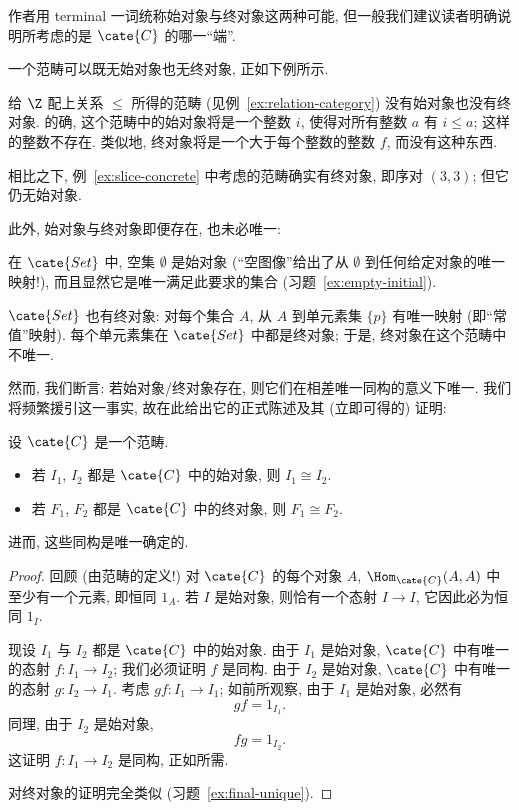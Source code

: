 作者用 terminal 一词统称始对象与终对象这两种可能, 但一般我们建议读者明确说明所考虑的是 $\cate{C}$ 的哪一``端''.

一个范畴可以既无始对象也无终对象, 正如下例所示.

\begin{example}
\label{ex:no-initial-final}
给 $\Z$ 配上关系 $\leq$ 所得的范畴 (见例~\ref{ex:relation-category}) 没有始对象也没有终对象. 的确, 这个范畴中的始对象将是一个整数 $i$, 使得对所有整数 $a$ 有 $i \leq a$; 这样的整数不存在. 类似地, 终对象将是一个大于每个整数的整数 $f$, 而没有这种东西.

相比之下, 例~\ref{ex:slice-concrete} 中考虑的范畴确实有终对象, 即序对 $(3,3)$; 但它仍无始对象.
\end{example}

此外, 始对象与终对象即便存在, 也未必唯一:

\begin{example}
\label{ex:final-singletons}
在 $\cate{Set}$ 中, 空集 $\emptyset$ 是始对象 (``空图像''给出了从 $\emptyset$ 到任何给定对象的唯一映射!), 而且显然它是唯一满足此要求的集合 (习题~\ref{ex:empty-initial}).

$\cate{Set}$ 也有终对象: 对每个集合 $A$, 从 $A$ 到单元素集 $\{p\}$ 有唯一映射 (即``常值''映射). 每个单元素集在 $\cate{Set}$ 中都是终对象; 于是, 终对象在这个范畴中不唯一.
\end{example}

然而, 我们断言: 若始对象/终对象存在, 则它们在相差唯一同构的意义下唯一. 我们将频繁援引这一事实, 故在此给出它的正式陈述及其 (立即可得的) 证明:

\begin{proposition}
\label{prop:initial-final-unique}
设 $\cate{C}$ 是一个范畴.
\begin{itemize}
	\item 若 $I_1$, $I_2$ 都是 $\cate{C}$ 中的始对象, 则 $I_1 \cong I_2$.
	\item 若 $F_1$, $F_2$ 都是 $\cate{C}$ 中的终对象, 则 $F_1 \cong F_2$.
\end{itemize}
进而, 这些同构是唯一确定的.
\end{proposition}

\begin{proof}
回顾 (由范畴的定义!) 对 $\cate{C}$ 的每个对象 $A$, $\Hom_{\cate{C}}(A, A)$ 中至少有一个元素, 即恒同 $1_A$. 若 $I$ 是始对象, 则恰有一个态射 $I \to I$, 它因此必为恒同 $1_I$.

现设 $I_1$ 与 $I_2$ 都是 $\cate{C}$ 中的始对象. 由于 $I_1$ 是始对象, $\cate{C}$ 中有唯一的态射 $f : I_1 \to I_2$; 我们必须证明 $f$ 是同构. 由于 $I_2$ 是始对象, $\cate{C}$ 中有唯一的态射 $g : I_2 \to I_1$. 考虑 $gf : I_1 \to I_1$; 如前所观察, 由于 $I_1$ 是始对象, 必然有
\[
gf = 1_{I_1}.
\]
同理, 由于 $I_2$ 是始对象,
\[
fg = 1_{I_2}.
\]
这证明 $f : I_1 \to I_2$ 是同构, 正如所需.

对终对象的证明完全类似 (习题~\ref{ex:final-unique}).
\end{proof}

